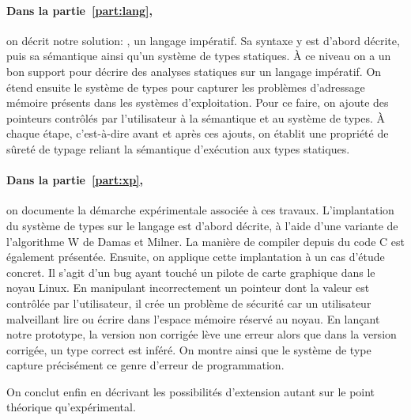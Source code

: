 \paragraph{Dans la partie~\ref{part:lang},} on décrit notre solution:
\langname{}, un langage impératif. Sa syntaxe y est d'abord décrite, puis sa
sémantique ainsi qu'un système de types statiques. À ce niveau on a un bon
support pour décrire des analyses statiques sur un langage impératif. On étend
ensuite le système de types pour capturer les problèmes d'adressage mémoire
présents dans les systèmes d'exploitation. Pour ce faire, on ajoute des
pointeurs contrôlés par l'utilisateur à la sémantique et au système de types. À
chaque étape, c'est-à-dire avant et après ces ajouts, on établit une propriété
de sûreté de typage reliant la sémantique d'exécution aux types statiques.

\paragraph{Dans la partie~\ref{part:xp},} on documente la démarche expérimentale
associée à ces travaux. L'implantation du système de types sur le langage
\newspeak est d'abord décrite, à l'aide d'une variante de l'algorithme W de
Damas et Milner. La manière de compiler depuis du code C est également
présentée. Ensuite, on applique cette implantation à un cas d'étude concret. Il
s'agit d'un bug ayant touché un pilote de carte graphique dans le noyau Linux.
En manipulant incorrectement un pointeur dont la valeur est contrôlée par
l'utilisateur, il crée un problème de sécurité car un utilisateur malveillant
lire ou écrire dans l'espace mémoire réservé au noyau. En lançant notre
prototype, la version non corrigée lève une erreur alors que dans la version
corrigée, un type correct est inféré. On montre ainsi que le système de type
capture précisément ce genre d'erreur de programmation.

On conclut enfin en décrivant les possibilités d'extension autant sur le point
théorique qu'expérimental.

